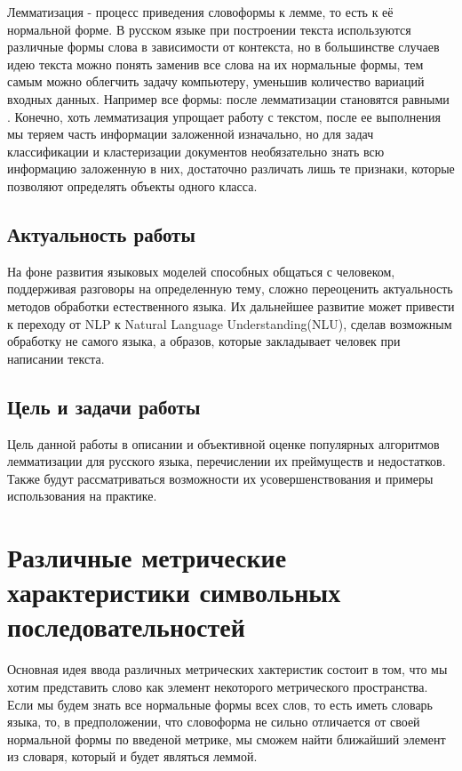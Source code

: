 \documentclass[12pt, a4paper]{article}
\begin{document}
Лемматизация - процесс приведения словоформы к лемме, то есть к её нормальной форме. В русском языке при построении текста используются различные формы слова в зависимости от контекста, но в большинстве случаев идею текста можно понять заменив все слова на их нормальные формы, тем самым можно облегчить задачу компьютеру, уменьшив количество вариаций входных данных. Например все формы:  после лемматизации становятся равными . Конечно, хоть лемматизация упрощает работу с текстом, после ее выполнения мы теряем часть информации заложенной изначально, но для задач классификации и кластеризации документов необязательно знать всю информацию заложенную в них, достаточно различать лишь те признаки, которые позволяют определять объекты одного класса.

\subsection{Актуальность работы}
\quad На фоне развития языковых моделей способных общаться с человеком, поддерживая разговоры на определенную тему, сложно переоценить актуальность методов обработки естественного языка. Их дальнейшее развитие может привести к переходу от NLP к Natural Language Understanding(NLU), сделав возможным обработку не самого языка, а образов, которые закладывает человек при написании текста.

\subsection{Цель и задачи работы}
\quad Цель данной работы в описании и объективной оценке популярных алгоритмов лемматизации для русского языка, перечислении их преймуществ и недостатков. Также будут рассматриваться возможности их усовершенствования и примеры использования на практике.

\section{Различные метрические характеристики символьных последовательностей}
\quad Основная идея ввода различных метрических хактеристик состоит в том, что мы хотим представить слово как элемент некоторого метрического пространства. Если мы будем знать все нормальные формы всех слов, то есть иметь словарь языка, то, в предположении, что словоформа не сильно отличается от своей нормальной формы по введеной метрике, мы сможем найти ближайший элемент из словаря, который и будет являться леммой.
\end{document}
